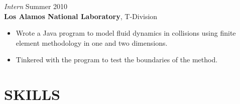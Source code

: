 \documentclass[margin, 10pt]{res} %
\begin{document}
\begin{resume}
{\sl Intern} \hfill Summer 2010 \\
\textbf{Los Alamos National Laboratory}, T-Division
\begin{itemize} \itemsep -2pt
\item Wrote a Java program to model fluid dynamics in collisions using finite element methodology in one and two dimensions. 
\item Tinkered with the program to test the boundaries of the method. 
\end{itemize} 

 
%
%
%
%


\section{SKILLS} 


\end{resume}
\end{document}

